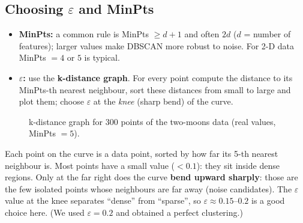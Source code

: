 \subsection{Choosing $\varepsilon$ and MinPts}

\begin{itemize}
  \item \textbf{MinPts:} a common rule is MinPts $\ge d+1$ and often $2d$ ($d$ = number of features); larger values make DBSCAN more robust to noise. For 2-D data MinPts $=4$ or $5$ is typical.
  \item \textbf{$\varepsilon$:} use the \textbf{k-distance graph}. For every point compute the distance to its MinPts-th nearest neighbour, sort these distances from small to large and plot them; choose $\varepsilon$ at the \emph{knee} (sharp bend) of the curve.
\end{itemize}

\begin{figure}[!htbp]
\centering
{}
\caption{k-distance graph for 300 points of the two-moons data (real values, MinPts $=5$).}\label{fig:kdist}
\end{figure}

\begin{explain}
Each point on the curve is a data point, sorted by how far its 5-th nearest neighbour is. Most points have a small value ($<0.1$): they sit inside dense regions. Only at the far right does the curve \textbf{bend upward sharply}: those are the few isolated points whose neighbours are far away (noise candidates). The $\varepsilon$ value at the knee separates ``dense'' from ``sparse'', so $\varepsilon\approx0.15$--$0.2$ is a good choice here. (We used $\varepsilon=0.2$ and obtained a perfect clustering.)
\end{explain}

